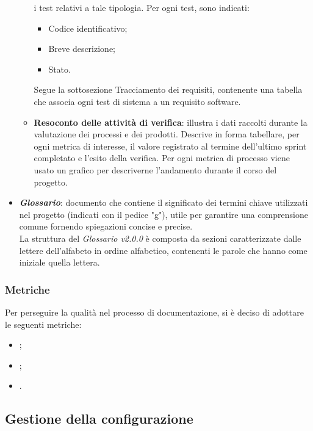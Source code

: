 \begin{itemize}
\begin{itemize}
                        i test relativi a tale tipologia. Per ogni test, sono indicati:
                        \begin{itemize}
                              \item Codice identificativo;
                              \item Breve descrizione;
                              \item Stato.
                        \end{itemize}
                        Segue la sottosezione Tracciamento dei requisiti, contenente una tabella che associa
                        ogni test di sistema a un requisito software.
                  \item \textbf{Resoconto delle attività di verifica}: illustra i dati raccolti durante la valutazione dei processi e dei prodotti.
                        Descrive in forma tabellare, per ogni metrica di interesse, il valore registrato al termine dell'ultimo sprint
                        completato e l'esito della verifica. Per ogni metrica di processo viene usato un grafico per descriverne l'andamento
                        durante il corso del progetto.
            \end{itemize}
      \item \textit{\textbf{Glossario}}: documento che contiene il significato dei termini chiave utilizzati nel progetto (indicati con il pedice "g"), utile per garantire una comprensione comune fornendo spiegazioni concise e precise.
            \\La struttura del \textit{Glossario v2.0.0} è composta da sezioni caratterizzate dalle lettere dell'alfabeto in ordine alfabetico, contenenti le parole che hanno come iniziale quella lettera.
\end{itemize}

\subsubsection{Metriche}
Per perseguire la qualità nel processo di documentazione, si è deciso di
adottare le seguenti metriche:
\begin{itemize}
      \item {};
      \item {};
      \item {}.
\end{itemize}

\subsection{Gestione della configurazione}
